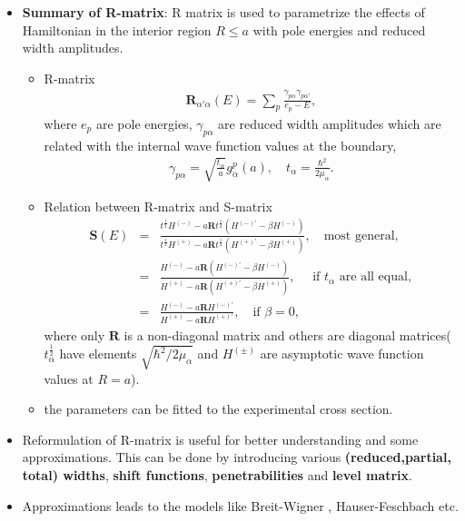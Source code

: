 \documentclass[11pt]{book}
\def\bm{\boldsymbol}
\newcommand{\bea}{\begin{eqnarray}}
\newcommand{\eea}{\end{eqnarray}}
\newcommand{\no}{\nonumber \\}
\begin{document}
\begin{itemize}
\item {\bf Summary of R-matrix}: R matrix is used to parametrize the 
    effects of Hamiltonian in the interior region $R\leq a$ with 
    pole energies and reduced width amplitudes. 
    \begin{itemize}
    \item R-matrix
        \bea 
         {\bm R}_{\alpha'\alpha}(E)
         =\sum_{p}\frac{\gamma_{p\alpha}\gamma_{p\alpha'}}{e_p-E},
        \eea 
        where $e_p$ are pole energies, $\gamma_{p\alpha}$ are
        reduced width amplitudes which are related with the 
        internal wave function values at the boundary,
        \bea 
        \gamma_{p\alpha}=\sqrt{\frac{t_\alpha}{a}} g_\alpha^p(a),
        \quad t_\alpha=\frac{\hbar^2}{2\mu_\alpha}.
        \eea 
     \item Relation between R-matrix and S-matrix
       \bea 
       {\bm S}(E)&=&\frac{ t^{\frac{1}{2}} H^{(-)} 
         - a{\bm R} t^{\frac{1}{2}}( H^{(-)'}-\beta H^{(-)})}
         { t^{\frac{1}{2}} H^{(+)} 
                  - a{\bm R} t^{\frac{1}{2}}( H^{(+)'}-\beta H^{(+)})},
                  \quad \mbox{most general},\no 
             &=& \frac{ H^{(-)} 
                      - a{\bm R} ( H^{(-)'}-\beta H^{(-)})}
                      {  H^{(+)} 
                  - a{\bm R} ( H^{(+)'}-\beta H^{(+)})},
                  \quad \mbox{ if $t_\alpha$ are all equal},\no 
             &=& \frac{ H^{(-)} - a{\bm R}  H^{(-)'}}
                      { H^{(+)} - a{\bm R}  H^{(+)'}},
                   \quad \mbox{if $\beta=0$},   
       \eea 
       where only ${\bm R}$ is a non-diagonal matrix and
       others are diagonal matrices( $t_\alpha^{\frac{1}{2}}$ 
       have elements $\sqrt{\hbar^2/2\mu_\alpha}$ 
       and $H^{(\pm)}$ are asymptotic wave function values at $R=a$).
      \item the  parameters can be fitted to the experimental cross section.
  
    \end{itemize} 
      \item Reformulation of R-matrix is useful for better understanding and some approximations. This can be done by introducing 
      various {\bf (reduced,partial, total) widths},
      {\bf shift functions}, {\bf penetrabilities}
      and {\bf level matrix}.
      \item Approximations leads to the models like 
          Breit-Wigner , Hauser-Feschbach etc.             
\end{itemize}
\end{document}
